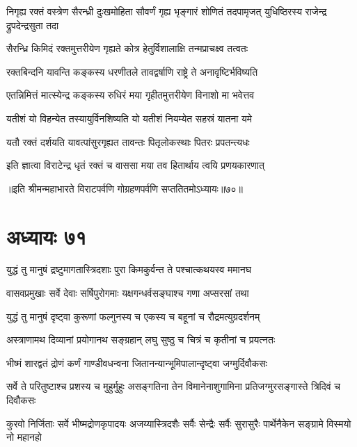 \threelineshloka
{निगृह्य रक्तं वस्त्रेण सैरन्ध्री दुःखमोहिता}
{सौवर्णं गृह्य भृङ्गारं शोणितं तदपामृजत्}
{युधिष्ठिरस्य राजेन्द्र द्रुपदेन्द्रसुता तदा}




\twolineshloka
{सैरन्ध्रि किमिदं रक्तमुत्तरीयेण गृह्यते}
{कोत्र हेतुर्विशालाक्षि तन्मप्राचक्ष्व तत्वतः}




\twolineshloka
{रक्तबिन्दनि यावन्ति कङ्कस्य धरणीतले}
{तावद्वर्षाणि राष्ट्रे ते अनावृष्टिर्भविष्यति}


\twolineshloka
{एतन्निमित्तं मात्स्येन्द्र कङ्कस्य रुधिरं मया}
{गृहीतमुत्तरीयेण विनाशो मा भवेत्तव}


\twolineshloka
{यतीशं यो विहन्येत तस्यायुर्विनशिष्यति}
{यो यतीशं नियम्येत सहस्रं यातना यमे}


\twolineshloka
{यतौ रक्तं दर्शयति यावत्पांसुरगृह्यत}
{तावन्तः पितृलोकस्थाः पितरः प्रपतन्त्यधः}


\twolineshloka
{इति ज्ञात्वा विराटेन्द्र धृतं रक्तं च वाससा}
{मया तव हितार्थाय त्वयि प्रणयकारणात्}

॥इति श्रीमन्महाभारते विराटपर्वणि गोग्रहणपर्वणि सप्ततितमोऽध्यायः॥७०॥

\chapter{अध्यायः ७१}

\twolineshloka
{युद्धं तु मानुषं द्रष्टुमागतास्त्रिदशाः पुरा}
{किमकुर्वन्त ते पश्चात्कथयस्व ममानघ}



\twolineshloka
{वासवप्रमुखाः सर्वे देवाः सर्षिपुरोगमाः}
{यक्षगन्धर्वसङ्घाश्च गणा अप्सरसां तथा}


\twolineshloka
{युद्धं तु मानुषं दृष्ट्वा कुरूणां फल्गुनस्य च}
{एकस्य च बहूनां च रौद्रमत्युग्रदर्शनम्}


\twolineshloka
{अस्त्राणामथ दिव्यानां प्रयोगानथ सङ्ग्रहान्}
{लघु सुष्ठु च चित्रं च कृतीनां च प्रयत्नतः}


\twolineshloka
{भीष्मं शारद्वतं द्रोणं कर्णं गाण्डीवधन्वना}
{जितानन्यान्भूमिपालान्दृष्ट्वा जग्मुर्दिवौकसः}


\threelineshloka
{सर्वे ते परितुष्टाश्च प्रशस्य च मुहुर्मुहुः}
{असङ्गतिना तेन विमानेनाशुगामिना}
{प्रतिजग्मुरसङ्गास्ते त्रिदिवं च दिवौकसः}


\threelineshloka
{कुरवो निर्जिताः सर्वे भीष्मद्रोणकृपादयः}
{अजय्यास्त्रिदशैः सर्वैः सेन्द्रैः सर्वैः सुरासुरैः}
{पार्थेनैकेन सङ्ग्रामे विस्मयो नो महानहो}


